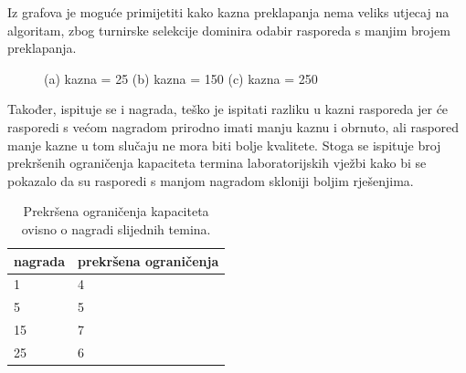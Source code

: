\documentclass[times, utf8, zavrsni]{fer}
\begin{document}
Iz grafova je moguće primijetiti kako kazna preklapanja nema veliks utjecaj na algoritam, zbog turnirske selekcije dominira odabir rasporeda s manjim brojem preklapanja.

\begin{figure}
    \centering
    \caption{(a) kazna = 25 (b) kazna = 150 (c) kazna = 250}
    \label{fig:kazne}
\end{figure}
\newpage

Također, ispituje se i nagrada, teško je ispitati razliku u kazni rasporeda jer će rasporedi s većom nagradom prirodno imati manju kaznu i obrnuto, ali raspored manje kazne u tom slučaju ne mora biti bolje kvalitete. Stoga se ispituje broj prekršenih ograničenja kapaciteta termina laboratorijskih vježbi kako bi se pokazalo da su rasporedi s manjom nagradom skloniji boljim rješenjima.

\begin{table}[htb]
\caption{Prekršena ograničenja kapaciteta ovisno o nagradi slijednih temina.}
\label{tbl:nagrada}
\centering
\begin{tabular}{ll} \hline
nagrada &  prekršena ograničenja\\ \hline
1 & 4  \\
5 & 5 \\
15  & 7 \\
25 & 6 \\ \hline
\end{tabular}
\end{table}
\end{document}
